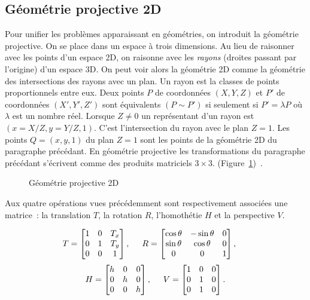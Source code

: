 \documentclass[a4paper,11pt]{amsart}
\newcommand{\dessin}[4]{
\begin{figure}[htb]
\centering
\HideDisplacementBoxes 
\BoxedEPSF{#1 scaled #2}
\caption{#3}
\label{#4}
\end{figure}}
\begin{document}
\subsection{G\'eom\'etrie projective 2D}
Pour unifier les probl\`emes apparaissant en g\'eo\-m\'etries, on 
introduit la g\'eom\'etrie projective.  On se place dans un espace \`a 
trois dimensions.  Au lieu de raisonner avec les points d'un espace 
2D, on raisonne avec les \emph{rayons} (droites passant par l'origine) 
d'un espace 3D. On peut voir alors la g\'eom\'etrie 2D comme la 
g\'eom\'etrie des intersections des rayons avec un plan.  Un rayon est 
la classes de points proportionnels entre eux.  Deux points $P$ de 
coordonn\'ees $(X,Y,Z)$ et $P'$ de coordonn\'ees $(X',Y',Z')$ sont 
\'equivalents $(P\sim P')$ si seulement si $P'=\lambda P$ o\`u 
$\lambda$ est un nombre r\'eel.  Lorsque $Z\not= 0$ un repr\'esentant 
d'un rayon est $(x=X/Z,y=Y/Z,1)$.  C'est l'intersection du rayon avec 
le plan $Z=1$.  Les points $Q=(x,y,1)$ du plan $Z=1$ sont les points 
de la g\'eom\'etrie 2D du paragraphe pr\'ec\'edant.  En g\'eom\'etrie 
projective les transformations du paragraphe pr\'ec\'edant 
s'\'ecrivent comme des produits matriciels $3\times 3$. 
(Figure~\ref{Pp})~\cite{FOLE95}.  

%
\dessin{espace3D.epsf}{800}{G\'eom\'etrie projective 2D}{Pp}
%

Aux quatre op\'erations vues pr\'ec\'edemment sont respectivement 
associ\'ees une matrice~: la translation $T$, la rotation $R$, 
l'homoth\'etie $H$ et la perspective $V$.

$$T=\begin{bmatrix}1&0&T_x\\0&1&T_y\\0&0&1\end{bmatrix},\hspace{0.5cm} 
R=\begin{bmatrix}\cos\theta&-\sin\theta&0\\
\sin\theta&\cos\theta&0\\0&0&1\end{bmatrix},\hspace{0.5cm}$$ 
$$H=\begin{bmatrix}h&0&0\\0&h&0\\0&0&h\end{bmatrix},\hspace{0.5cm} 
V=\begin{bmatrix}1&0&0\\0&1&0\\0&1&0\end{bmatrix}.$$
\end{document}
